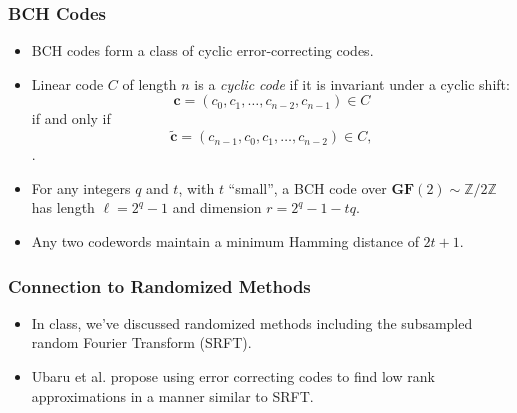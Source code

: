 \documentclass[9pt]{beamer}
\newcommand{\mB}{\mathbb}
\begin{document}
\begin{frame}
\frametitle{BCH Codes}
\begin{itemize}
\item BCH codes form a class of cyclic error-correcting codes.
\vspace{4mm}

\item Linear code $C$ of length $n$ is a \textit{cyclic code} if it is invariant under a cyclic shift:
\[ \textbf{c} = (c_0, c_1, \hdots, c_{n-2}, c_{n-1} ) \in C \] if and only if 
\[ \tilde{\textbf{c}} = (c_{n-1}, c_0, c_1, \hdots, c_{n-2}) \in C, \] \cite{hall2003notes}.
\vspace{4mm}

\item For any integers $q$ and $t$, with $t$ ``small'', a BCH code over $\mathbf{GF}(2) \sim \mathbb{Z}/2\mathbb{Z}$ has length $\ell = 2^q -1$ and dimension $r = 2^q -1- tq$.
\vspace{4mm}

\item Any two codewords maintain a minimum Hamming distance of $2t + 1$.

\end{itemize}
\end{frame}


\begin{frame}
\frametitle{Connection to Randomized Methods} 
\begin{itemize} 
   \item In class, we've discussed randomized methods including the subsampled random Fourier Transform (SRFT).
\vspace{4mm}

\item Ubaru et al. \cite{ubaru2015low} propose using error correcting codes to find low rank approximations in a manner similar to SRFT.
\vspace{4mm}

\end{itemize}
\end{frame}
\end{document}
